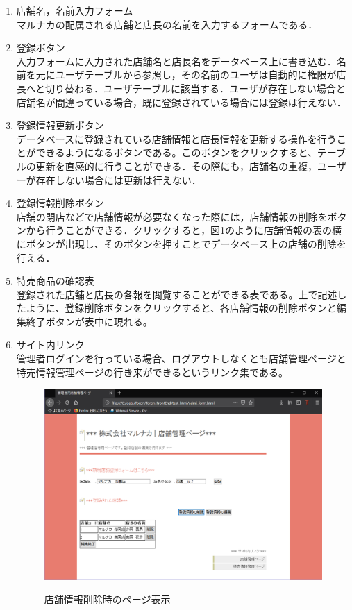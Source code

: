 \documentclass[a4j]{jarticle}
\begin{document}
\begin{enumerate}
\renewcommand{\labelenumi}{\textcircled{\scriptsize \theenumi}}
\item 店舗名，名前入力フォーム\\
マルナカの配属される店舗と店長の名前を入力するフォームである．
\item 登録ボタン\\
入力フォームに入力された店舗名と店長名をデータベース上に書き込む．名前を元にユーザテーブルから参照し，その名前のユーザは自動的に権限が店長へと切り替わる．ユーザテーブルに該当する．ユーザが存在しない場合と店舗名が間違っている場合，既に登録されている場合には登録は行えない．
\item 登録情報更新ボタン\\

データベースに登録されている店舗情報と店長情報を更新する操作を行うことができるようになるボタンである。このボタンをクリックすると、テーブルの更新を直感的に行うことができる．その際にも，店舗名の重複，ユーザーが存在しない場合には更新は行えない．
\item 登録情報削除ボタン\\
店舗の閉店などで店舗情報が必要なくなった際には，店舗情報の削除をボタンから行うことができる．クリックすると，図\ref{tentyou2}のように店舗情報の表の横にボタンが出現し、そのボタンを押すことでデータベース上の店舗の削除を行える．

\item 特売商品の確認表\\

登録された店舗と店長の各報を閲覧することができる表である。上で記述したように、登録削除ボタンをクリックすると、各店舗情報の削除ボタンと編集終了ボタンが表中に現れる。

\item サイト内リンク\\

管理者ログインを行っている場合、ログアウトしなくとも店舗管理ページと特売情報管理ページの行き来ができるというリンク集である。
\begin{figure}[H]
  \begin{center}
    \includegraphics[width=15cm]{tentyou2.png}\\
    \caption{店舗情報削除時のページ表示}
    \label{tentyou2}
  \end{center}
\end{figure}
\end{enumerate}
\end{document}
